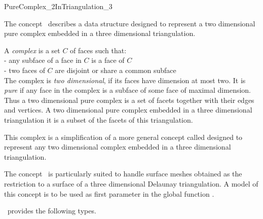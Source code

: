 

\begin{ccRefConcept}{PureComplex_2InTriangulation_3}


\ccDefinition
  
The concept \ccRefName\ describes a data structure
designed  to represent a  two dimensional pure complex 
embedded in a three dimensional triangulation.

A {\em complex} is a set $C$ of faces such that:\\
- any subface of a face in $C$ is a face of $C$ \\
- two faces of $C$ are disjoint or share a common subface \\
The complex is {\em two dimensional}, if its faces have dimension at most
two. It is {\em pure} if any face in the complex is a subface
of some face of maximal dimension.
Thus a two dimensional pure complex is a set of facets
together with their edges and vertices.
A  two dimensional pure complex  embedded 
in a three dimensional triangulation
it is a subset of the  facets 
of this triangulation.

This complex is a simplification of a more general concept called
 designed to represent any
two dimensional complex 
embedded in a three dimensional triangulation.

The concept \ccRefName\  is particularly suited to handle
surface meshes obtained as the restriction to a surface of 
a  three dimensional Delaunay triangulation.
A model of this concept is to  be used as first parameter in the global
function .


 



\ccTypes
\ccRefName\ provides the following types.


\end{ccRefConcept}
